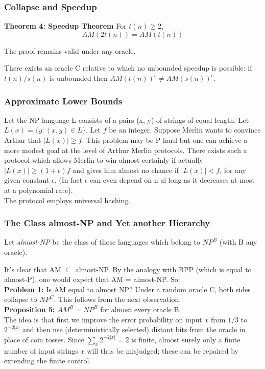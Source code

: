 \documentclass{beamer}
\begin{document}
\begin{frame}
\frametitle{Collapse and Speedup}
\textbf{Theorem 4: Speedup Theorem}
For $t(n) \geq 2$, $$AM(2t(n)) = AM(t(n))$$

The proof remains valid under any oracle.

There exists an oracle C relative to which no unbounded speedup is possible: if $t(n) / s(n)$ is unbounded then $AM(t(n))^c \neq AM(s(n))^c$. 
\end{frame}

\begin{frame}
\frametitle{Approximate Lower Bounds}

Let the NP-language L consists of a pairs (x, y) of strings of equal length. Let $L(x) = \{y: (x, y) \in L\}$. Let $f$ be an integer. Suppose Merlin wants to convince Arthur that $|L(x)| \geq f$. This problem may be P-hard but one can achieve a more modest goal at the level of Arthur Merlin protocols. There exists such a protocol which allows Merlin to win almost certainly if actually $|L(x)| \geq (1 + \epsilon)f$ and gives him almost no chance if $|L(x)| < f$, for any given constant $\epsilon$. (In fact $\epsilon$ can even depend on n al long as it decreases at most at a polynomial rate). \\
The protocol employs universal hashing.
\end{frame}

\begin{frame}
\frametitle{The Class almost-NP and Yet another Hierarchy}
Let \textit{almost-NP} be the class of those languages which belong to $NP^B$ (with B any oracle).

It's clear that AM $\subseteq$ almost-NP. By the analogy with BPP (which is equal to almost-P), one would expect that AM = almost-NP. So:\\
\textbf{Problem 1:} Is AM equal to almost NP?
Under a random oracle C, both sides collapse to $NP^C$. This follows from the next observation.\\
\textbf{Proposition 5:} $AM^B = NP^B$ for almost every oracle B.\\
The idea is that first we improve the error probability on input $x$ from $1/3$ to $2^{-2|x|}$ and then use (deterministically selected) distant bits from the oracle in place of coin tosses. 
Since $\sum_x 2^{-2|x|} = 2$ is finite, almost surely only a finite number of input strings $x$ will thus be misjudged; these can be repaired by extending the finite control.
\end{frame}
\end{document}
